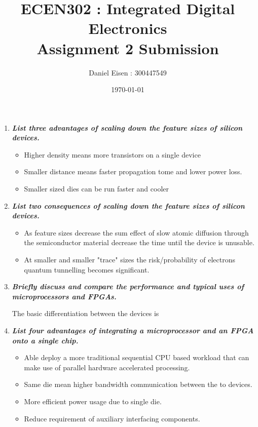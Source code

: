 \documentclass[11pt]{article}
\title{ECEN302 : Integrated Digital Electronics \\ Assignment 2 Submission}
\author{Daniel Eisen : 300447549}
\date{\today}
\begin{document}
\begin{preview}
\maketitle
\begin{enumerate}
    \item \textit{\textbf{List three advantages of scaling down the feature sizes of silicon devices.}}
    
    \begin{itemize}
        \item Higher density means more transistors on a single device
        \item Smaller distance means faster propagation tome and lower power loss.
        \item Smaller sized dies can be run faster and cooler 
    \end{itemize}
    
    \item \textit{\textbf{List two consequences of scaling down the feature sizes of silicon devices.}}
    
    \begin{itemize}
        \item As feature sizes decrease the sum effect of slow atomic diffusion through the semiconductor material decrease the time until the device is unusable.
        \item At smaller and smaller "trace" sizes the risk/probability of electrons quantum tunnelling becomes significant.  
    \end{itemize}
    
    \item \textit{\textbf{Briefly discuss and compare the performance and typical uses of microprocessors and FPGAs.}}
    
    The basic differentiation between the devices is 
    
    
    \item \textit{\textbf{List four advantages of integrating a microprocessor and an FPGA onto a single chip.}}
    
    \begin{itemize}
        \item Able deploy a more traditional sequential CPU based workload that can make use of parallel hardware accelerated processing.
        \item Same die mean higher bandwidth communication between the to devices.
        \item More efficient power usage due to single die.
        \item Reduce requirement of auxiliary interfacing components.
    \end{itemize}
    

\end{enumerate}
\end{preview}
\end{document}
